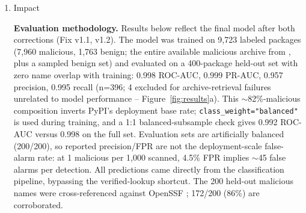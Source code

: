 \documentclass[preprint,12pt, a4paper]{elsarticle}
\begin{document}
\begin{enumerate}
\item Impact

\textbf{Evaluation methodology.} Results below reflect the final model after both corrections (Fix v1.1, v1.2). The model was trained on 9,723 labeled packages (7,960 malicious, 1,763 benign; the entire available malicious archive from \cite{malregistry}, plus a sampled benign set) and evaluated on a 400-package held-out set with zero name overlap with training: 0.998 ROC-AUC, 0.999 PR-AUC, 0.957 precision, 0.995 recall (n=396; 4 excluded for archive-retrieval failures unrelated to model performance -- Figure~\ref{fig:results}a). This $\sim$82\%-malicious composition inverts PyPI's deployment base rate; \texttt{class\_weight="balanced"} is used during training, and a 1:1 balanced-subsample check gives 0.992 ROC-AUC versus 0.998 on the full set. Evaluation sets are artificially balanced (200/200), so reported precision/FPR are not the deployment-scale false-alarm rate: at 1 malicious per 1,000 scanned, 4.5\% FPR implies $\sim$45 false alarms per detection. All predictions came directly from the classification pipeline, bypassing the verified-lookup shortcut. The 200 held-out malicious names were cross-referenced against OpenSSF \cite{ossfmalicious}; 172/200 (86\%) are corroborated.


\end{enumerate}
\end{document}
